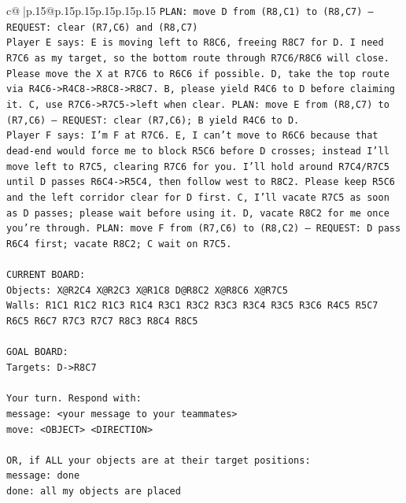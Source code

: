 \documentclass{article}
\begin{document}
{\begin{supertabular}{c@{$\;$}|p{.15\linewidth}@{}p{.15\linewidth}p{.15\linewidth}p{.15\linewidth}p{.15\linewidth}p{.15\linewidth}}
{{{\texttt{PLAN: move D from (R8,C1) to (R8,C7) — REQUEST: clear (R7,C6) and (R8,C7)} \\
\texttt{Player E says: E is moving left to R8C6, freeing R8C7 for D. I need R7C6 as my target, so the bottom route through R7C6/R8C6 will close. Please move the X at R7C6 to R6C6 if possible. D, take the top route via R4C6{-}>R4C8{-}>R8C8{-}>R8C7. B, please yield R4C6 to D before claiming it. C, use R7C6{-}>R7C5{-}>left when clear. PLAN: move E from (R8,C7) to (R7,C6) — REQUEST: clear (R7,C6); B yield R4C6 to D.} \\
\texttt{Player F says: I'm F at R7C6. E, I can't move to R6C6 because that dead{-}end would force me to block R5C6 before D crosses; instead I'll move left to R7C5, clearing R7C6 for you. I'll hold around R7C4/R7C5 until D passes R6C4{-}>R5C4, then follow west to R8C2. Please keep R5C6 and the left corridor clear for D first. C, I'll vacate R7C5 as soon as D passes; please wait before using it. D, vacate R8C2 for me once you're through. PLAN: move F from (R7,C6) to (R8,C2) — REQUEST: D pass R6C4 first; vacate R8C2; C wait on R7C5.} \\
\\ 
\texttt{CURRENT BOARD:} \\
\texttt{Objects: X@R2C4 X@R2C3 X@R1C8 D@R8C2 X@R8C6 X@R7C5} \\
\texttt{Walls: R1C1 R1C2 R1C3 R1C4 R3C1 R3C2 R3C3 R3C4 R3C5 R3C6 R4C5 R5C7 R6C5 R6C7 R7C3 R7C7 R8C3 R8C4 R8C5} \\
\\ 
\texttt{GOAL BOARD:} \\
\texttt{Targets: D{-}>R8C7} \\
\\ 
\texttt{Your turn. Respond with:} \\
\texttt{message: <your message to your teammates>} \\
\texttt{move: <OBJECT> <DIRECTION>} \\
\\ 
\texttt{OR, if ALL your objects are at their target positions:} \\
\texttt{message: done} \\
\texttt{done: all my objects are placed} \\
            }
        }
    }
     \\ \\


\end{supertabular}}
\end{document}
